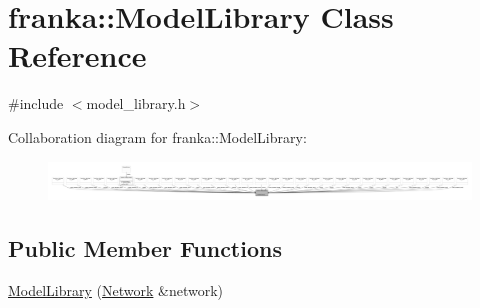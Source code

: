 \hypertarget{classfranka_1_1ModelLibrary}{}\section{franka\+:\+:Model\+Library Class Reference}
\label{classfranka_1_1ModelLibrary}


{\ttfamily \#include $<$model\+\_\+library.\+h$>$}



Collaboration diagram for franka\+:\+:Model\+Library\+:
\nopagebreak
\begin{figure}[H]
\begin{center}
\leavevmode
\includegraphics[width=350pt]{classfranka_1_1ModelLibrary__coll__graph}
\end{center}
\end{figure}
\subsection*{Public Member Functions}
\begin{DoxyCompactItemize}
\item 
\hyperlink{classfranka_1_1ModelLibrary_a3f15c2a63dc31a7312ac37a106d18dcf}{Model\+Library} (\hyperlink{classfranka_1_1Network}{Network} \&network)
\end{DoxyCompactItemize}
